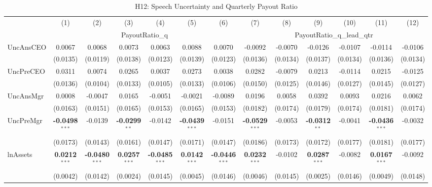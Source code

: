 \begin{landscape}
\begin{table}[H]
\setlength{\tabcolsep}{3pt}
\renewcommand{\arraystretch}{0.85}
\centering
\caption{H12: Speech Uncertainty and Quarterly Payout Ratio}
\label{tab:h12}
\scriptsize
\begin{tabular}{lcccccccccccc}
\toprule
 & (1) & (2) & (3) & (4) & (5) & (6) & (7) & (8) & (9) & (10) & (11) & (12) \\
 & \multicolumn{6}{c}{PayoutRatio\_q} & \multicolumn{6}{c}{PayoutRatio\_q\_lead\_qtr} \\
\cmidrule(lr){2-7} \cmidrule(lr){8-13}
\midrule
UncAnsCEO & 0.0067 & 0.0068 & 0.0073 & 0.0063 & 0.0088 & 0.0070 & -0.0092 & -0.0070 & -0.0126 & -0.0107 & -0.0114 & -0.0106 \\
 & (0.0135) & (0.0119) & (0.0138) & (0.0123) & (0.0139) & (0.0123) & (0.0136) & (0.0134) & (0.0137) & (0.0134) & (0.0136) & (0.0134) \\
UncPreCEO & 0.0311 & 0.0074 & 0.0265 & 0.0037 & 0.0273 & 0.0038 & 0.0282 & -0.0079 & 0.0213 & -0.0114 & 0.0215 & -0.0125 \\
 & (0.0136) & (0.0104) & (0.0133) & (0.0105) & (0.0133) & (0.0106) & (0.0150) & (0.0125) & (0.0146) & (0.0127) & (0.0145) & (0.0127) \\
UncAnsMgr & 0.0008 & -0.0047 & 0.0165 & -0.0051 & -0.0021 & -0.0089 & 0.0196 & 0.0058 & 0.0392 & 0.0093 & 0.0216 & 0.0062 \\
 & (0.0163) & (0.0151) & (0.0165) & (0.0153) & (0.0165) & (0.0153) & (0.0182) & (0.0174) & (0.0179) & (0.0174) & (0.0181) & (0.0174) \\
UncPreMgr & \textbf{-0.0498}$^{***}$ & -0.0139 & \textbf{-0.0299}$^{**}$ & -0.0142 & \textbf{-0.0439}$^{***}$ & -0.0151 & \textbf{-0.0529}$^{***}$ & -0.0053 & \textbf{-0.0312}$^{**}$ & -0.0041 & \textbf{-0.0436}$^{***}$ & -0.0032 \\
 & (0.0173) & (0.0143) & (0.0161) & (0.0147) & (0.0171) & (0.0147) & (0.0186) & (0.0173) & (0.0172) & (0.0177) & (0.0181) & (0.0177) \\
\midrule
lnAssets & \textbf{0.0212}$^{***}$ & \textbf{-0.0480}$^{***}$ & \textbf{0.0257}$^{***}$ & \textbf{-0.0485}$^{***}$ & \textbf{0.0142}$^{***}$ & \textbf{-0.0446}$^{***}$ & \textbf{0.0232}$^{***}$ & -0.0102 & \textbf{0.0287}$^{***}$ & -0.0082 & \textbf{0.0167}$^{***}$ & -0.0092 \\
 & (0.0042) & (0.0142) & (0.0024) & (0.0145) & (0.0045) & (0.0146) & (0.0046) & (0.0145) & (0.0025) & (0.0146) & (0.0049) & (0.0148) \\

\end{tabular}
\end{table}
\end{landscape}
